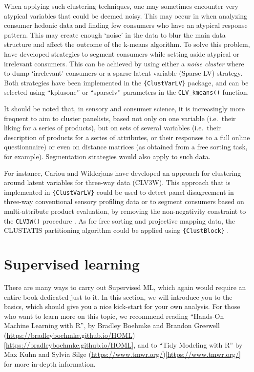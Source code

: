 \documentclass[
]{krantz}
\begin{document}
When applying such clustering techniques, one may sometimes encounter very atypical variables that could be deemed noisy. This may occur in when analyzing consumer hedonic data and finding few consumers who have an atypical response pattern. This may create enough `noise' in the data to blur the main data structure and affect the outcome of the k-means algorithm. To solve this problem, \citet{vigneau2016} have developed strategies to segment consumers while setting aside atypical or irrelevant consumers. This can be achieved by using either a \emph{noise cluster} where to dump `irrelevant' consumers or a sparse latent variable (Sparse LV) strategy. Both strategies have been implemented in the \texttt{\{ClustVarLV\}} package, and can be selected using ``kplusone'' or ``sparselv'' parameters in the \texttt{CLV\_kmeans()} function.

It should be noted that, in sensory and consumer science, it is increasingly more frequent to aim to cluster panelists, based not only on one variable (i.e.~their liking for a series of products), but on sets of several variables (i.e.~their description of products for a series of attributes, or their responses to a full online questionnaire) or even on distance matrices (as obtained from a free sorting task, for example). Segmentation strategies would also apply to such data.

For instance, Cariou and Wilderjans have developed an approach for clustering around latent variables for three-way data (CLV3W). This approach that is implemented in \texttt{\{ClustVarLV\}} could be used to detect panel disagreement in three-way conventional sensory profiling data \citep{wilderjans2016} or to segment consumers based on multi-attribute product evaluation, by removing the non-negativity constraint to the \texttt{CLV3W()} procedure \citep{cariou2018}. As for free sorting and projective mapping data, the CLUSTATIS partitioning algorithm could be applied using \texttt{\{ClustBlock\}} \citep[\citet{llobell2020}]{llobell2019}.

\hypertarget{supervised-learning}{%
\section{Supervised learning}\label{supervised-learning}}

There are many ways to carry out Supervised ML, which again would require an entire book dedicated just to it. In this section, we will introduce you to the basics, which should give you a nice kick-start for your own analysis. For those who want to learn more on this topic, we recommend reading ``Hands-On Machine Learning with R'', by Bradley Boehmke and Brandon Greewell (\url{https://bradleyboehmke.github.io/HOML}){[}\url{https://bradleyboehmke.github.io/HOML}{]}, and to ``Tidy Modeling with R'' by Max Kuhn and Sylvia Silge (\url{https://www.tmwr.org/}){[}\url{https://www.tmwr.org/}{]} for more in-depth information.
\end{document}
